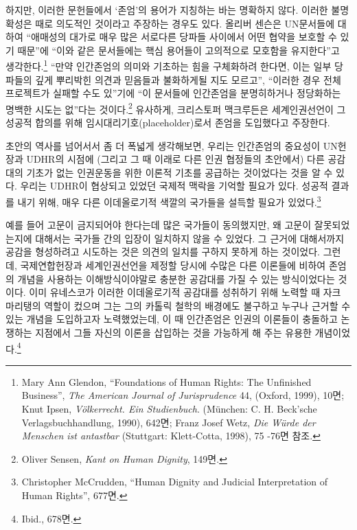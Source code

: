 하지만, 이러한 문헌들에서 `존엄'의 용어가 지칭하는 바는 명확하지 않다. 이러한 불명확성은 때로 의도적인 것이라고 주장하는 경우도 있다. 올리버 센슨은 UN문서들에 대하여 ``애매성의 대가로 매우 많은 서로다른 당파들 사이에서 어떤 협약을 보호할 수 있기 때문''에 ``이와 같은 문서들에는 핵심 용어들이 고의적으로 모호함을 유지한다''고 생각한다.\footnote{Mary Ann Glendon, ``Foundations of Human Rights: The Unfinished Business'', \emph{The American Journal of Jurisprudence} 44, (Oxford, 1999), 10면; Knut Ipsen, \emph{Völkerrecht. Ein Studienbuch}. (München: C. H. Beck'sche Verlagsbuchhandlung, 1990), 642면; Franz Josef Wetz, \emph{Die Würde der Menschen ist antastbar} (Stuttgart: Klett-Cotta, 1998), 75 -76면 참조.} ``만약 인간존엄의 의미와 기초하는 힘을 구체화하려 한다면, 이는 일부 당파들의 깊게 뿌리박힌 의견과 믿음들과 불화하게될 지도 모르고'', ``이러한 경우 전체 프로젝트가 실패할 수도 있''기에 ``이 문서들에 인간존엄을 분명히하거나 정당화하는 명백한 시도는 없''다는 것이다.\footnote{Oliver Sensen, \emph{Kant on Human Dignity}, 149면.} 유사하게, 크리스토퍼 맥크루든은 세계인권선언이 그 성공적 합의를 위해 임시대리기호(placeholder)로서 존엄을 도입했다고 주장한다.

초안의 역사를 넘어서서 좀 더 폭넓게 생각해보면, 우리는 인간존엄의 중요성이 UN헌장과 UDHR의 시점에 (그리고 그 때 이래로 다른 인권 협정들의 초안에서) 다른 공감대의 기초가 없는 인권운동을 위한 이론적 기초를 공급하는 것이었다는 것을 알 수 있다. 우리는 UDHR이 협상되고 있었던 국제적 맥락을 기억할 필요가 있다. 성공적 결과를 내기 위해, 매우 다른 이데올로기적 색깔의 국가들을 설득할 필요가 있었다.\footnote{Christopher McCrudden, ``Human Dignity and Judicial Interpretation of Human Rights'', 677면.}

예를 들어 고문이 금지되어야 한다는데 많은 국가들이 동의했지만, 왜 고문이 잘못되었는지에 대해서는 국가들 간의 입장이 일치하지 않을 수 있었다. 그 근거에 대해서까지 공감을 형성하려고 시도하는 것은 의견의 일치를 구하지 못하게 하는 것이었다. 그런데, 국제연합헌장과 세계인권선언을 제정할 당시에 수많은 다른 이론들에 비하여 존엄의 개념을 사용하는 이해방식이야말로 충분한 공감대를 가질 수 있는 방식이었다는 것이다. 이미 유네스코가 이러한 이데올로기적 공감대를 성취하기 위해 노력할 때 자크 마리탱의 역할이 컸으며 그는 그의 카톨릭 철학의 배경에도 불구하고 누구나 근거할 수 있는 개념을 도입하고자 노력했었는데, 이 때 인간존엄은 인권의 이론들이 충돌하고 논쟁하는 지점에서 그들 자신의 이론을 삽입하는 것을 가능하게 해 주는 유용한 개념이었다.\footnote{Ibid., 678면.}

